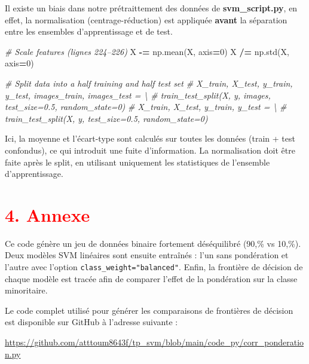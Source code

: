 \documentclass[
  12pt,
]{article}
\newenvironment{Shaded}{\begin{snugshade}}{\end{snugshade}}
\newcommand{\CommentTok}[1]{\textcolor[rgb]{0.56,0.35,0.01}{\textit{#1}}}
\newcommand{\DecValTok}[1]{\textcolor[rgb]{0.00,0.00,0.81}{#1}}
\newcommand{\NormalTok}[1]{#1}
\newcommand{\OperatorTok}[1]{\textcolor[rgb]{0.81,0.36,0.00}{\textbf{#1}}}
\begin{document}
Il existe un biais dans notre prétraittement des données de
\textbf{svm\_script.py}, en effet, la normalisation (centrage-réduction)
est appliquée \textbf{avant} la séparation entre les ensembles
d'apprentissage et de test.

\begin{Shaded}
\begin{Highlighting}[]
\CommentTok{\# Scale features (lignes 224–226)}
\NormalTok{X }\OperatorTok{{-}=}\NormalTok{ np.mean(X, axis}\OperatorTok{=}\DecValTok{0}\NormalTok{)}
\NormalTok{X }\OperatorTok{/=}\NormalTok{ np.std(X, axis}\OperatorTok{=}\DecValTok{0}\NormalTok{)}

\CommentTok{\# Split data into a half training and half test set}
\CommentTok{\# X\_train, X\_test, y\_train, y\_test, images\_train, images\_test = \textbackslash{}}
\CommentTok{\#    train\_test\_split(X, y, images, test\_size=0.5, random\_state=0)}
\CommentTok{\# X\_train, X\_test, y\_train, y\_test = \textbackslash{}}
\CommentTok{\#    train\_test\_split(X, y, test\_size=0.5, random\_state=0)}
\end{Highlighting}
\end{Shaded}

Ici, la moyenne et l'écart-type sont calculés sur toutes les données
(train + test confondus), ce qui introduit une fuite d'information. La
normalisation doit être faite après le split, en utilisant uniquement
les statistiques de l'ensemble d'apprentissage.

\newpage

\section{\texorpdfstring{\textcolor{red}{4. Annexe}}{}}\label{section-8}

Ce code génère un jeu de données binaire fortement déséquilibré (90,\%
vs 10,\%). Deux modèles SVM linéaires sont ensuite entraînés : l'un sans
pondération et l'autre avec l'option \texttt{class\_weight="balanced"}.
Enfin, la frontière de décision de chaque modèle est tracée afin de
comparer l'effet de la pondération sur la classe minoritaire.

Le code complet utilisé pour générer les comparaisons de frontières de
décision est disponible sur GitHub à l'adresse suivante :

\textcolor{blue}{\url{https://github.com/atttoum8643f/tp_svm/blob/main/code_py/corr_ponderation.py}}
\end{document}
